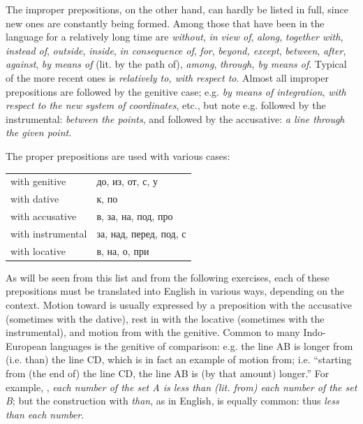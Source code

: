 The improper prepositions, on the other hand, can hardly be listed in full, since new ones are constantly being formed. Among those that have been in the language for a relatively long time are  \emph{without},  \emph{in view of},  \emph{along},  \emph{together with},  \emph{instead of},  \emph{outside},  \emph{inside},  \emph{in consequence of},  \emph{for},  \emph{beyond, except},  \emph{between},  \emph{after},  \emph{against},  \emph{by means of} (lit. by the path of),  \emph{among},  \emph{through, by means of}. Typical of the more recent ones is  \emph{relatively to, with respect to}. Almost all improper prepositions are followed by the genitive case; e.g.  \emph{by means of integration},  \emph{with respect to the new system of coordinates}, etc., but note e.g.  followed by the instrumental:  \emph{between the points}, and  followed by the accusative:  \emph{a line through the given point}.

The proper prepositions are used with various cases:
\begin{center}
\small
\begin{tabular}{@{}l >{\cyrillicfont}p{112mm}@{}}
with genitive & до, из, от, с, у\\
with dative & к, по\\
with accusative & в, за, на, под, про\\
with instrumental & за, над, перед, под, с\\
with locative & в, на, о, при\\
\end{tabular}
\end{center}

As will be seen from this list and from the following exercises, each of these prepositions must be translated into English in various ways, depending on the context. Motion toward is usually expressed by a preposition with the accusative (sometimes with the dative), rest in with the locative (sometimes with the instrumental), and motion from with the genitive. Common to many Indo-European languages is the genitive of comparison: e.g. the line AB is longer from (i.e. than) the line CD, which is in fact an example of motion from; i.e. ``starting from (the end of) the line CD, the line AB is (by that amount) longer.'' For example, , \emph{each number of the set A is less than (lit. from) each number of the set B}; but the construction with  \emph{than}, as in English, is equally common: thus  \emph{less than each number}.

